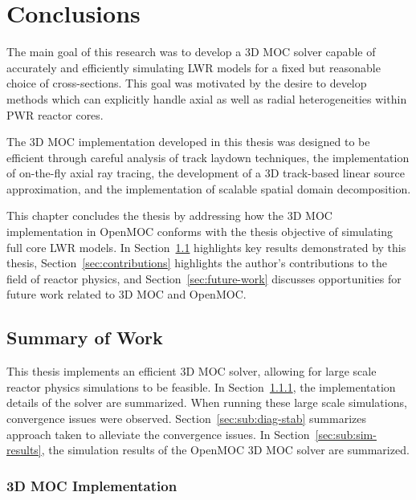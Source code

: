 \chapter{Conclusions}
\label{chap:conclusions}

The main goal of this research was to develop a 3D \ac{MOC} solver capable of accurately and efficiently simulating \ac{LWR} models for a fixed but reasonable choice of cross-sections. This goal was motivated by the desire to develop methods which can explicitly handle axial as well as radial heterogeneities within \ac{PWR} reactor cores. 

The 3D \ac{MOC} implementation developed in this thesis was designed to be efficient through careful analysis of track laydown techniques, the implementation of on-the-fly axial ray tracing, the development of a 3D track-based linear source approximation, and the implementation of scalable spatial domain decomposition.

This chapter concludes the thesis by addressing how the 3D \ac{MOC} implementation in OpenMOC conforms with the thesis objective of simulating full core \ac{LWR} models. In Section~\ref{sec:work-summary} highlights key results demonstrated by this thesis, Section~\ref{sec:contributions} highlights the author's contributions to the field of reactor physics, and Section~\ref{sec:future-work} discusses opportunities for future work related to 3D \ac{MOC} and OpenMOC.


\section{Summary of Work}
\label{sec:work-summary}

This thesis implements an efficient 3D \ac{MOC} solver, allowing for large scale reactor physics simulations to be feasible. In Section~\ref{sec:sub:3dmoc-imp}, the implementation details of the solver are summarized. When running these large scale simulations, convergence issues were observed. Section~\ref{sec:sub:diag-stab} summarizes approach taken to alleviate the convergence issues. In Section~\ref{sec:sub:sim-results}, the simulation results of the OpenMOC 3D \ac{MOC} solver are summarized.

\subsection{3D MOC Implementation}
\label{sec:sub:3dmoc-imp}

